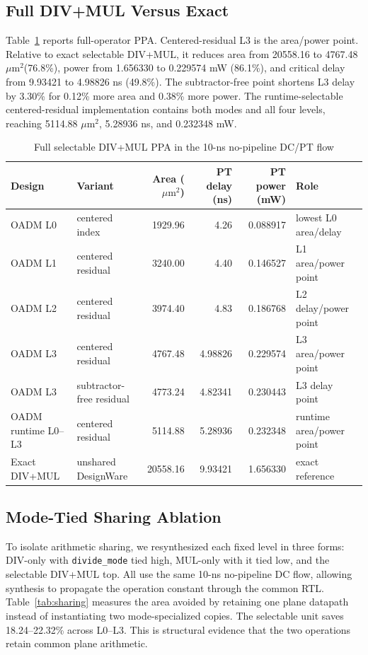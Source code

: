 \documentclass[conference]{IEEEtran}
\newcommand{\um}{\ensuremath{\mu\mathrm{m}^2}}
\begin{document}
\subsection{Full DIV+MUL Versus Exact}
Table~\ref{tab:full} reports full-operator PPA. Centered-residual L3 is the
area/power point. Relative to exact selectable DIV+MUL, it reduces area from
20558.16 to 4767.48 \um (76.8\%), power from 1.656330 to 0.229574 mW (86.1\%),
and critical delay from 9.93421 to 4.98826 ns (49.8\%). The subtractor-free
point shortens L3 delay by 3.30\% for 0.12\% more area and 0.38\% more power.
The runtime-selectable centered-residual implementation contains both modes
and all four levels, reaching 5114.88 \um, 5.28936 ns, and 0.232348 mW.

\begin{table}[t]
\caption{Full selectable DIV+MUL PPA in the 10-ns no-pipeline DC/PT flow}
\label{tab:full}
\centering\small
\begin{tabular}{llrrrl}
\toprule
Design & Variant & Area (\um) & PT delay (ns) & PT power (mW) & Role \\
\midrule
OADM L0 & centered index & 1929.96 & 4.26 & 0.088917 & lowest L0 area/delay \\
OADM L1 & centered residual & 3240.00 & 4.40 & 0.146527 & L1 area/power point \\
OADM L2 & centered residual & 3974.40 & 4.83 & 0.186768 & L2 delay/power point \\
OADM L3 & centered residual & 4767.48 & 4.98826 & 0.229574 & L3 area/power point \\
OADM L3 & subtractor-free residual & 4773.24 & 4.82341 & 0.230443 & L3 delay point \\
OADM runtime L0--L3 & centered residual & 5114.88 & 5.28936 & 0.232348 & runtime area/power point \\
Exact DIV+MUL & unshared DesignWare & 20558.16 & 9.93421 & 1.656330 & exact reference \\
\bottomrule
\end{tabular}
\end{table}

\subsection{Mode-Tied Sharing Ablation}
To isolate arithmetic sharing, we resynthesized each fixed level in three
forms: DIV-only with \texttt{divide\_mode} tied high, MUL-only with it tied
low, and the selectable DIV+MUL top. All use the same 10-ns no-pipeline DC
flow, allowing synthesis to propagate the operation constant through the
common RTL. Table~\ref{tab:sharing} measures the area avoided by retaining one
plane datapath instead of instantiating two mode-specialized copies. The
selectable unit saves 18.24--22.32\% across L0--L3. This is structural evidence
that the two operations retain common plane arithmetic.
\end{document}
